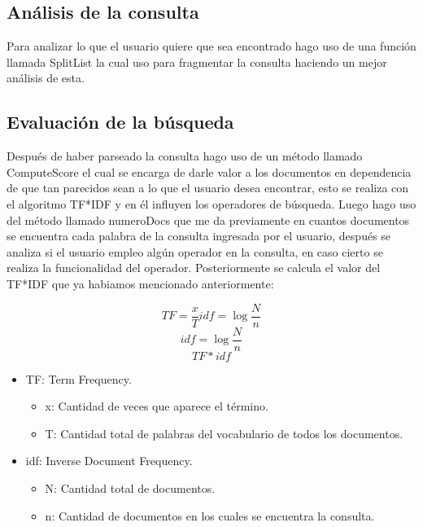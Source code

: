 \documentclass[a4paper,12pt]{article}
\begin{document}
    \subsection{Análisis de la consulta}
    Para analizar lo que el usuario quiere que sea encontrado hago uso de una función 
    llamada SplitList la cual uso para fragmentar la consulta haciendo un mejor análisis
    de esta.
    \subsection{Evaluación de la búsqueda}
    Después de haber parseado la consulta hago uso de un método llamado ComputeScore el cual
    se encarga de darle valor a los documentos en dependencia de que tan parecidos sean a lo que
    el usuario desea encontrar, esto se realiza con el algoritmo TF*IDF y en él influyen los 
    operadores de búsqueda. Luego hago uso del método llamado numeroDocs que me da
    previamente en cuantos documentos se encuentra cada palabra de la consulta ingresada por el usuario,
    después se analiza si el usuario empleo algún operador en la consulta, en caso cierto se realiza 
    la funcionalidad del operador. Posteriormente se calcula el valor del TF*IDF que ya habiamos mencionado
    anteriormente:

    \begin{equation}\label{eq:grav}
        TF = \frac{x}{T}       idf  = \log {\frac{N}{n}}
    \end{equation}
    \begin{equation}
        idf  = \log {\frac{N}{n}}
    \end{equation}
    \begin{equation}
        TF\ast idf
    \end{equation}

    \begin{itemize}
        \item TF\@: Term Frequency.
        \begin{itemize}
            \item x\@: Cantidad de veces que aparece el término.
            \item T\@: Cantidad total de palabras del vocabulario de todos los documentos.
        \end{itemize}
        \item idf: Inverse Document Frequency.
        \begin{itemize}
            \item N\@: Cantidad total de documentos.
            \item n\@: Cantidad de documentos en los cuales se encuentra la consulta.
        \end{itemize}
    \end{itemize}
\end{document}

